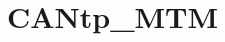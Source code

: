\chapter{CANtp\+\_\+\+MTM}
\hypertarget{md__r_e_a_d_m_e}{}\label{md__r_e_a_d_m_e}
\label{md__r_e_a_d_m_e_autotoc_md0}%
%
